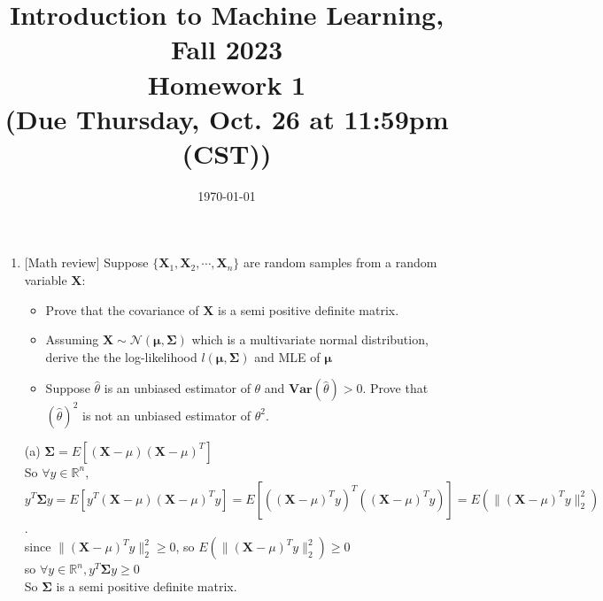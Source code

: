 \documentclass[10pt]{article}
\begin{document}
\date{\today}
\title{Introduction to Machine Learning, Fall 2023 \\
	Homework 1\\
	\small (Due Thursday, Oct. 26 at 11:59pm (CST))}
\maketitle
\begin{enumerate}[1.]


	\item {} [Math review] Suppose $\{\mathbf{X}_1, \mathbf{X}_2, \cdots, \mathbf{X}_n\}$ are random samples from a random variable $\mathbf{X}$:
	      \begin{itemize}
		      \item[(a)] Prove that the covariance of $\mathbf{X}$ is a semi positive definite matrix. ~
		      \item[(b)] Assuming $\mathbf{X}\sim \mathcal{N}(\mathbf{\mu},\mathbf{\Sigma})$ which is a multivariate normal distribution, derive the the log-likelihood $\mathit{l}(\mathbf{\mu},\mathbf{\Sigma})$ and MLE of $\mathbf{\mu}$ ~
		      \item[(c)] Suppose $\hat{\theta}$ is an unbiased estimator of $\theta$ and $\mathbf{Var}(\hat{\theta})>0$. Prove that $(\hat{\theta})^2$ is not an unbiased estimator of $\theta^2$. ~
	      \end{itemize}

(a) $\mathbf{\Sigma}=E[(\mathbf{X}-\mu)(\mathbf{X}-\mu)^T]$\\
So $\forall y\in\mathbb{R}^n$,\\
$y^T\mathbf{\Sigma} y=E[y^T(\mathbf{X}-\mu)(\mathbf{X}-\mu)^Ty]=E[((\mathbf{X}-\mu)^Ty)^T((\mathbf{X}-\mu)^Ty)]=E(\|(\mathbf{X}-\mu)^Ty\|_2^2)$.\\
since $\|(\mathbf{X}-\mu)^Ty\|_2^2\geq0$, so $E(\|(\mathbf{X}-\mu)^Ty\|_2^2)\geq0$\\
so $\forall y\in\mathbb{R}^n,y^T\mathbf{\Sigma} y\geq 0$\\
So $\mathbf{\Sigma}$ is a semi positive definite matrix.\\


\end{enumerate}
\end{document}
